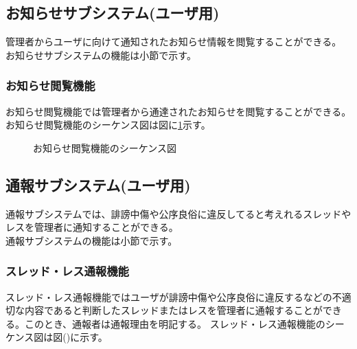 \documentclass[a4j]{jarticle}
\begin{document}
\subsection{お知らせサブシステム(ユーザ用)}
管理者からユーザに向けて通知されたお知らせ情報を閲覧することができる。\\
お知らせサブシステムの機能は小節で示す。
  \subsubsection{お知らせ閲覧機能}
  お知らせ閲覧機能では管理者から通達されたお知らせを閲覧することができる。
  お知らせ閲覧機能のシーケンス図は図に\ref{fig:news_reading.png}示す。
  
        \begin{figure}[H]
\centering
{}
\caption{お知らせ閲覧機能のシーケンス図}
\label{fig:news_reading.png}
\end{figure}
\subsection{通報サブシステム(ユーザ用)}
通報サブシステムでは、誹謗中傷や公序良俗に違反してると考えれるスレッドやレスを管理者に通知することができる。\\
通報サブシステムの機能は小節で示す。
\subsubsection{スレッド・レス通報機能}
  スレッド・レス通報機能ではユーザが誹謗中傷や公序良俗に違反するなどの不適切な内容であると判断したスレッドまたはレスを管理者に通報することができる。このとき、通報者は通報理由を明記する。
スレッド・レス通報機能のシーケンス図は図()に示す。
\end{document}
